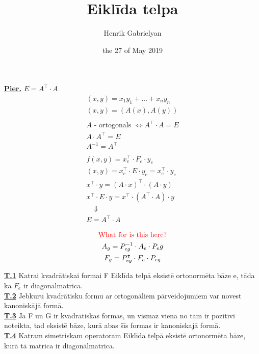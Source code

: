 \documentclass[12pt]{article}
\title{Eiklīda telpa}
\author{Henrik Gabrielyan}
\date{the 27 of May 2019}
\begin{document}
\maketitle

\textbf{\underline{Pier.}}  $E = A^{\intercal} \cdot A$
\begin{gather*}
	(x,y) = x_1y_1 + \ldots + x_ny_n  \\
	(x,y) = (A(x), A(y)) \\
	\\
	A \text{ - ortogonāls } \Leftrightarrow A^{\intercal} \cdot A = E \\ 
	A \cdot A^{\intercal} = E \\
	A^{-1} = A^{\intercal} \\
	\\
	f(x,y) = x_e^{\intercal} \cdot F_e \cdot y_e \\
	(x,y) = x_e^{\intercal} \cdot E \cdot y_e = x_e^{\intercal}  \cdot y_e \\
	x^{\intercal} \cdot y = (A \cdot x)^{\intercal} \cdot (A \cdot y) \\
	x^{\intercal} \cdot E \cdot y  = x^{\intercal} \cdot (A^{\intercal} \cdot A) \cdot y \\
	\quad \Downarrow \\
	E = A^{\intercal} \cdot A
\end{gather*}

\pagebreak

\begin{gather*}
	\text{\color{red}{What for is this here?}}\\
	A_g = P_{eg}^{-1} \cdot A_e \cdot P_eg \\
	F_g = P_{eg}^{\intercal} \cdot F_e \cdot P_{eg}
\end{gather*}

\textbf{\underline{T.1}} Katrai kvadrātiskai formai F Eiklīda telpā eksistē ortonormēta bāze e, tāda ka $F_e$ ir diagonālmatrica. \\
\textbf{\underline{T.2}} Jebkuru kvadrātisku formu ar ortogonāliem pārveidojumiem var novest kanoniskājā formā. \\ %
\textbf{\underline{T.3}}  Ja F un G ir kvadrātiskas formas, un vismaz viena no tām ir pozitīvi noteikta, tad eksistē bāze, kurā abas šīs formas ir kanoniskajā formā. \\
\textbf{\underline{T.4}}  Katram simetriskam operatoram Eiklīda telpā eksistē ortonormēta bāze, kurā tā matrica ir diagonālmatrica. \\
\end{document}
